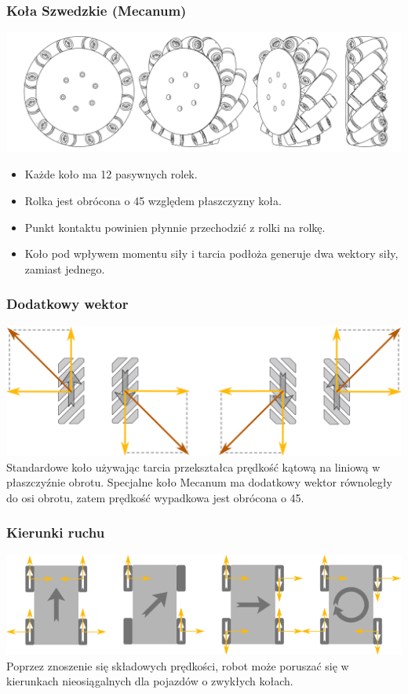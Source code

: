 \documentclass{beamer}
\begin{document}
	\begin{frame}
		\frametitle{Koła Szwedzkie (Mecanum)}
		\centering
		\includegraphics[width=\textwidth]{graphics/wheel.pdf}
		\begin{itemize}
			\item Każde koło ma 12 pasywnych rolek.
			\item Rolka jest obrócona o 45\textdegree{} względem płaszczyzny koła.
			\item Punkt kontaktu powinien płynnie przechodzić z rolki na rolkę.
			\item Koło pod wpływem momentu siły i tarcia podłoża generuje dwa wektory siły, zamiast jednego.
		\end{itemize}
	\end{frame}
	\begin{frame}
		\frametitle{Dodatkowy wektor}
		\centering
		\includegraphics[width=\textwidth]{graphics/vectors.pdf} \\
		Standardowe koło używając tarcia przekształca prędkość kątową na liniową w płaszczyźnie obrotu.
		Specjalne koło Mecanum ma dodatkowy wektor równoległy do osi obrotu, zatem prędkość wypadkowa jest obrócona o 45\textdegree.
	\end{frame}
	\begin{frame}
		\frametitle{Kierunki ruchu}
		\centering
		\includegraphics[width=\textwidth]{graphics/dirs.pdf} \\
		Poprzez znoszenie się składowych prędkości, robot może poruszać się w kierunkach nieosiągalnych dla pojazdów o zwykłych kołach.
	\end{frame}
\end{document}

